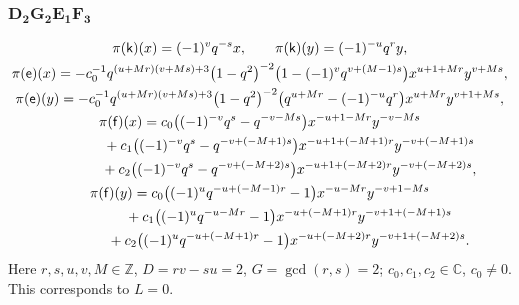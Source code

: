 \documentclass[10pt,a4paper]{amsart}
\numberwithin{equation}{section}
\begin{document}
\subsubsection*{$\boldsymbol{D_2G_2E_1F_3}$}
\begin{gather*}
\pi(\mathsf{k})(x)= (-1)^vq^{-s}x ,\qquad\pi(\mathsf{k})(y)=(-1)^{-u}q^ry ,\\
\pi(\mathsf{e})(x)= -c_0^{-1}q^{(u+Mr)(v+Ms)+3}\big(1-q^2\big)^{-2}\big(1-(-1)^vq^{v+(M-1)s}\big)x^{u+1+Mr}y^{v+Ms} ,\\
\pi(\mathsf{e})(y)= -c_0^{-1}q^{(u+Mr)(v+Ms)+3}\big(1-q^2\big)^{-2}\big(q^{u+Mr}-(-1)^{-u}q^r\big)x^{u+Mr}y^{v+1+Ms} ,\\
\pi(\mathsf{f})(x)= c_0\big((-1)^{-v}q^s-q^{-v-Ms}\big)x^{-u+1-Mr}y^{-v-Ms}\\
\hphantom{\pi(\mathsf{f})(x)=}{}+ c_1\big((-1)^{-v}q^s-q^{-v+(-M+1)s}\big)x^{-u+1+(-M+1)r}y^{-v+(-M+1)s}\\
\hphantom{\pi(\mathsf{f})(x)=}{}+ c_2\big((-1)^{-v}q^s-q^{-v+(-M+2)s}\big)x^{-u+1+(-M+2)r}y^{-v+(-M+2)s} ,\\
\pi(\mathsf{f})(y)= c_0\big((-1)^uq^{-u+(-M-1)r}-1\big)x^{-u-Mr}y^{-v+1-Ms}\\
\hphantom{\pi(\mathsf{f})(y)=}{} + c_1\big((-1)^uq^{-u-Mr}-1\big)x^{-u+(-M+1)r}y^{-v+1+(-M+1)s}\\
\hphantom{\pi(\mathsf{f})(y)=}{} + c_2\big((-1)^uq^{-u+(-M+1)r}-1\big)x^{-u+(-M+2)r}y^{-v+1+(-M+2)s} .
\end{gather*}
Here $r,s,u,v,M\in\mathbb{Z}$, $D=rv-su=2$, $G=\operatorname{gcd}(r,s)=2$; $c_0,c_1,c_2\in\mathbb{C}$, $c_0\ne 0$. This corresponds to $L=0$.
\end{document}
